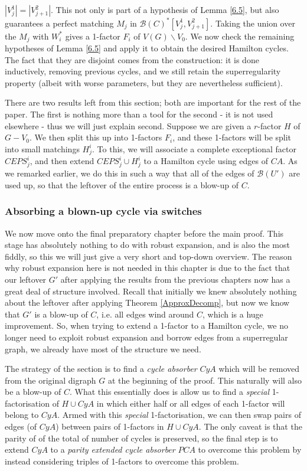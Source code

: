\documentclass[10pt,letterpaper, reqno]{amsart}
\theoremstyle{definition}
\numberwithin{equation}{section}
\begin{document}
$|V^1_j|=|V^2_{j+1}|$. This not only is part of a hypothesis of Lemma \ref{6.5}, but also guarantees a perfect matching $M_j$ in $\mathcal{B}(C)^*[V_j^1, V^2_{j+1}]$. Taking the union over the $M_j$ with $W_i^*$ gives a 1-factor $F_i$ of $V(G)\backslash V_0$. We now check the remaining hypotheses of Lemma \ref{6.5} and apply it to obtain the desired Hamilton cycles. The fact that they are disjoint comes from the construction: it is done inductively, removing previous cycles, and we still retain the superregularity property (albeit with worse parameters, but they are nevertheless sufficient).

There are two results left from this section; both are important for the rest of the paper. The first is nothing more than a tool for the second - it is not used elsewhere - thus we will just explain second. Suppose we are given a $r$-factor $H$ of $G-V_0$. We then split this up into 1-factors $F_i$, and these 1-factors will be split into small matchings $H^i_j$. To this, we will associate a complete exceptional factor $CEPS^i_j$, and then extend $CEPS^i_j \cup H^i_j$ to a Hamilton cycle using edges of $CA$. As we remarked earlier, we do this in such a way that all of the edges of $\mathcal{B}(U')$ are used up, so that the leftover of the entire process is a blow-up of $C$. 

\subsubsection{Absorbing a blown-up cycle via switches} We now move onto the final preparatory chapter before the main proof. This stage has absolutely nothing to do with robust expansion, and is also the most fiddly, so this we will just give a very short and top-down overview. The reason why robust expansion here is not needed in this chapter is due to the fact that our leftover $G'$ after applying the results from the previous chapters now has a great deal of structure involved. Recall that initially we knew absolutely nothing about the leftover after applying Theorem \ref{ApproxDecomp}, but now we know that $G'$ is a blow-up of $C$, i.e. all edges wind around $C$, which is a huge improvement. So, when trying to extend a 1-factor to a Hamilton cycle, we no longer need to exploit robust expansion and borrow edges from a superregular graph, we already have most of the structure we need. 

The strategy of the section is to find a \textit{cycle absorber} $CyA$ which will be removed from the original digraph $G$ at the beginning of the proof. This naturally will also be a blow-up of $C$. What this essentially does is allow us to find a \textit{special} 1-factorisation of $H \cup CyA$ in which either half or all edges of each 1-factor will belong to $CyA$. Armed with this \textit{special} 1-factorisation, we can then swap pairs of edges (of $CyA$) between pairs of 1-factors in $H \cup CyA$. The only caveat is that the parity of of the total of number of cycles is preserved, so the final step is to extend $CyA$ to a \textit{parity extended cycle absorber} $PCA$ to overcome this problem by instead considering triples of 1-factors to overcome this problem. 
\end{document}
